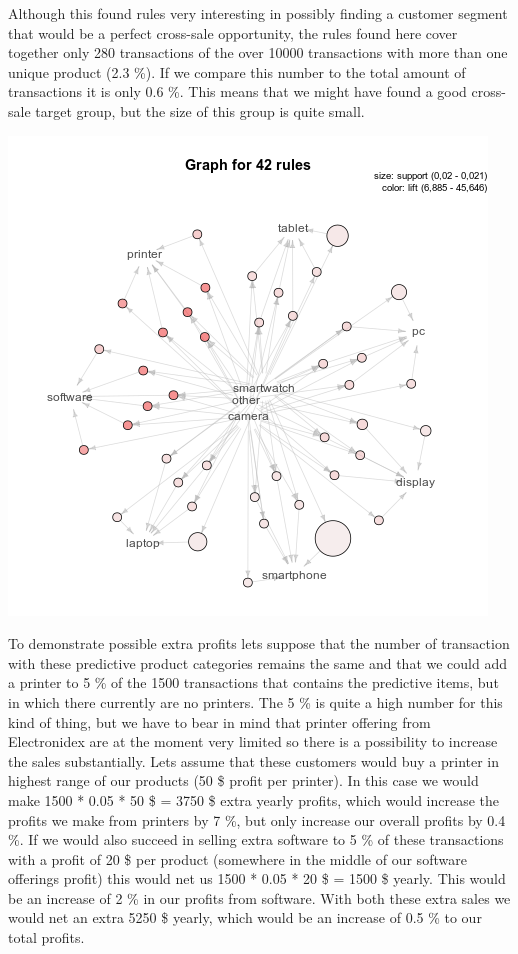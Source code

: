 \documentclass[12pt,a4paper,leqno]{report}
\theoremstyle{plain}
\theoremstyle{definition}
\theoremstyle{remark}
\begin{document}
Although this found rules very interesting in possibly finding a customer segment that would
be a perfect cross-sale opportunity, the rules found here cover together only 280 transactions of the
over 10000 transactions with more than one unique product (2.3 \%). If we compare this number to the total
amount of transactions it is only 0.6 \%. This means that we might have found a good cross-sale
target group, but the size of this group is quite small.

\bigskip
{
    \centering
    \includegraphics[width=\textwidth,height=\textheight,keepaspectratio]{apriori_product_category_level_graph.png}
    \par
}
\bigskip

To demonstrate possible extra profits lets suppose that the number of transaction with these
predictive product categories remains the same and that we could add a printer to 5 \% of the
1500 transactions that contains the predictive items, but in which there currently are no printers.
The 5 \% is quite a high number for this kind of thing, but we have to bear in mind that
printer offering from Electronidex are at the moment very limited so there is a possibility
to increase the sales substantially. Lets assume that these customers would buy a printer
in highest range of our products (50 \$ profit per printer). In this case we would make
1500 * 0.05 * 50 \$ = 3750 \$ extra yearly profits, which would increase the profits we make from
printers by 7 \%, but only increase our overall profits by 0.4 \%. If we would also succeed in
selling extra software to 5 \% of these transactions with a profit of 20 \$ per product (somewhere in the middle
of our software offerings profit) this would net us 1500 * 0.05 * 20 \$ = 1500 \$ yearly. This would
be an increase of 2 \% in our profits from software. With both these extra sales we would net
an extra 5250 \$ yearly, which would be an increase of 0.5 \% to our total profits.
\end{document}
